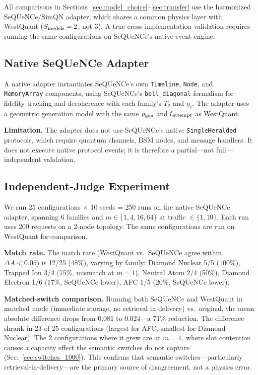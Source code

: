 \documentclass{ams-journal}
\begin{document}
All comparisons in Sections~\ref{sec:model_choice}--\ref{sec:transfer} use the harmonized SeQUeNCe/SimQN adapter, which shares a common physics layer with WestQuant ($S_{\rm models} = 2$, not 3). A true cross-implementation validation requires running the same configurations on SeQUeNCe's native event engine.

\subsection{Native SeQUeNCe Adapter}

A native adapter instantiates SeQUeNCe's own \texttt{Timeline}, \texttt{Node}, and \texttt{MemoryArray} components, using SeQUeNCe's \texttt{bell\_diagonal} formalism for fidelity tracking and decoherence with each family's $T_2$ and $\eta_r$. The adapter uses a geometric generation model with the same $p_{\rm gen}$ and $t_{\rm attempt}$ as WestQuant.

\textbf{Limitation.} The adapter does not use SeQUeNCe's native \texttt{SingleHeralded} protocols, which require quantum channels, BSM nodes, and message handlers. It does not execute native protocol events; it is therefore a partial---not full---independent validation.

\subsection{Independent-Judge Experiment}

We run 25 configurations $\times$ 10 seeds = 250 runs on the native SeQUeNCe adapter, spanning 6 families and $m \in \{1, 4, 16, 64\}$ at traffic $\in \{1, 10\}$. Each run uses 200 requests on a 2-node topology. The same configurations are run on WestQuant for comparison.

\textbf{Match rate.} The match rate (WestQuant vs.\ SeQUeNCe agree within $\Delta A < 0.05$) is 12/25 (48\%), varying by family: Diamond Nuclear 5/5 (100\%), Trapped Ion 3/4 (75\%, mismatch at $m=1$), Neutral Atom 2/4 (50\%), Diamond Electron 1/6 (17\%, SeQUeNCe lower), AFC 1/5 (20\%, SeQUeNCe lower).

\textbf{Matched-switch comparison.} Running both SeQUeNCe and WestQuant in matched mode (immediate storage, no retrieval in delivery) vs.\ original, the mean absolute difference drops from 0.081 to 0.024---a 71\% reduction. The difference shrank in 23 of 25 configurations (largest for AFC, smallest for Diamond Nuclear). The 2 configurations where it grew are at $m=1$, where slot contention causes a capacity effect the semantic switches do not capture (Sec.~\ref{sec:switches_1000}). This confirms that semantic switches---particularly retrieval-in-delivery---are the primary source of disagreement, not a physics error.
\end{document}
